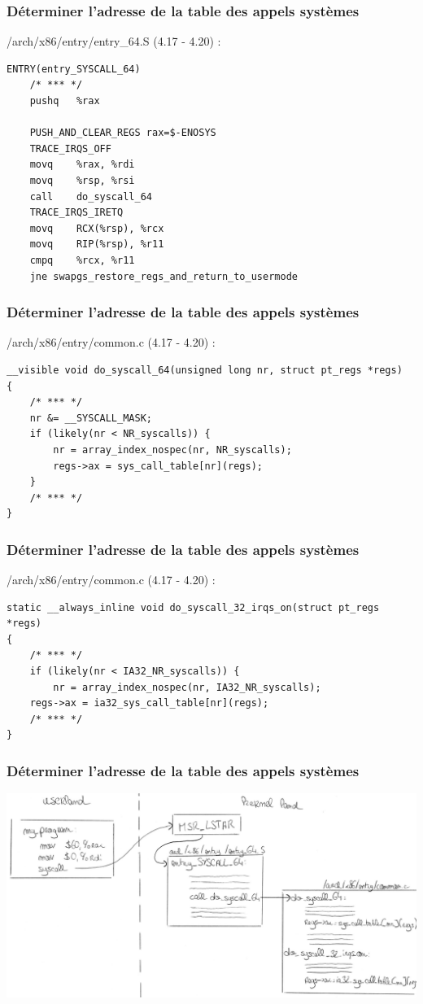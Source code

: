\documentclass{beamer}
\begin{document}
\begin{frame}[fragile]
\frametitle{Déterminer l'adresse de la table des appels systèmes}
/arch/x86/entry/entry\_64.S (4.17 - 4.20) :
\begin{lstlisting}[style=CStyle]
ENTRY(entry_SYSCALL_64)
	/* *** */
	pushq	%rax

	PUSH_AND_CLEAR_REGS rax=$-ENOSYS
	TRACE_IRQS_OFF
	movq	%rax, %rdi
	movq	%rsp, %rsi
	call	do_syscall_64
	TRACE_IRQS_IRETQ
	movq	RCX(%rsp), %rcx
	movq	RIP(%rsp), %r11
	cmpq	%rcx, %r11
	jne	swapgs_restore_regs_and_return_to_usermode
\end{lstlisting}
\end{frame}
\begin{frame}[fragile]
\frametitle{Déterminer l'adresse de la table des appels systèmes}
/arch/x86/entry/common.c (4.17 - 4.20) :
\begin{lstlisting}[style=CStyle]
__visible void do_syscall_64(unsigned long nr, struct pt_regs *regs)
{
	/* *** */
	nr &= __SYSCALL_MASK;
	if (likely(nr < NR_syscalls)) {
		nr = array_index_nospec(nr, NR_syscalls);
		regs->ax = sys_call_table[nr](regs);
	}
	/* *** */
}
\end{lstlisting}
\end{frame}
\begin{frame}[fragile]
\frametitle{Déterminer l'adresse de la table des appels systèmes}
/arch/x86/entry/common.c (4.17 - 4.20) :
\begin{lstlisting}[style=CStyle]
static __always_inline void do_syscall_32_irqs_on(struct pt_regs *regs)
{
	/* *** */
	if (likely(nr < IA32_NR_syscalls)) {
		nr = array_index_nospec(nr, IA32_NR_syscalls);
	regs->ax = ia32_sys_call_table[nr](regs);
	/* *** */
}
\end{lstlisting}
\end{frame}
\begin{frame}
\frametitle{Déterminer l'adresse de la table des appels systèmes}
\includegraphics[scale=0.43]{figure}
\end{frame}
\end{document}
